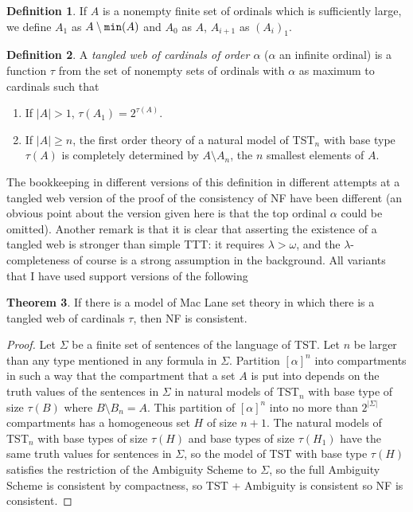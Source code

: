 \documentclass[112pt]{article}
\theoremstyle{definition}
\newtheorem{theorem}{Theorem}[section]
\newtheorem{definition}[theorem]{Definition}
\theoremstyle{remark}
\begin{document}
\begin{definition}
If $A$ is a nonempty finite set of ordinals which is sufficiently large, we define $A_1$ as $A \setminus {\tt min}(A)$ and $A_0$ as $A$, $A_{i+1}$ as $(A_i)_1$.
\end{definition}
\begin{definition}
A {\em tangled web of cardinals of order $\alpha$\/} ($\alpha$ an infinite ordinal) is a function $\tau$ from the set of nonempty sets of ordinals with $\alpha$ as maximum
to cardinals such that

\begin{enumerate}

\item  If $|A|>1$, $\tau(A_1) = 2^{\tau(A)}$.

\item  If $|A|\geq n$, the first order theory of a natural model of TST$_n$ with base type $\tau(A)$ is completely determined by $A \setminus A_n$, the
$n$ smallest elements of $A$.

\end{enumerate}
\end{definition}

The bookkeeping in different versions of this definition in different attempts at a tangled web version of the proof of the consistency of NF have been different (an obvious point about the version given here is that the top ordinal $\alpha$ could be omitted).  Another remark is that it is clear that asserting the existence of a tangled web is stronger than simple TTT:  it requires $\lambda>\omega$, and the $\lambda$-completeness of course is a strong assumption in the background.  All variants that I have used support versions of the following

\begin{theorem}
If there is a model of Mac Lane set theory in which there is a tangled web of cardinals $\tau$, then NF is consistent.
\end{theorem}

\begin{proof}
Let $\Sigma$ be a finite set of sentences of the language of TST.  Let $n$ be larger than any type mentioned in any formula in $\Sigma$.
Partition $[\alpha]^n$ into compartments in such a way that the compartment that a set $A$ is put into depends on the truth values of the sentences in $\Sigma$ in natural models of TST$_n$  with base type of size $\tau(B)$ where $B \setminus B_n=A$.  This partition of $[\alpha]^n$ into no more than
$2^{|\Sigma|}$ compartments has a homogeneous set $H$ of size $n+1$.  The natural models of TST$_n$ with base types of size $\tau(H)$ and base
types of size $\tau(H_1)$ have the same truth values for sentences in $\Sigma$, so the model of TST with base type $\tau(H)$ satisfies the restriction of the Ambiguity Scheme to $\Sigma$, so the full Ambiguity Scheme is consistent by compactness, so TST + Ambiguity is consistent so NF is consistent.
\end{proof}
\end{document}
